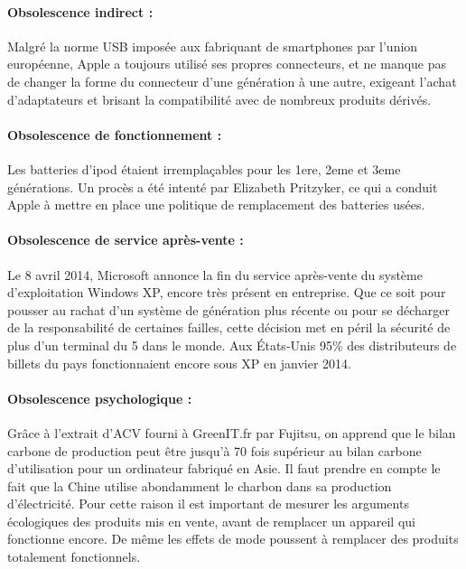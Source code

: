 \paragraph*{Obsolescence indirect :}

Malgré la norme USB imposée aux fabriquant de smartphones par l’union européenne, Apple a toujours utilisé ses propres connecteurs, et ne manque pas de changer la forme du connecteur d’une génération à une autre, exigeant l'achat d'adaptateurs et brisant la compatibilité avec de nombreux produits dérivés.

\paragraph*{Obsolescence de fonctionnement :}

Les batteries d’ipod étaient irremplaçables pour les 1ere, 2eme et 3eme générations. Un procès a été intenté par Elizabeth Pritzyker, ce qui a conduit Apple à mettre en place une politique de remplacement des batteries usées.

\paragraph*{Obsolescence de service après-vente :}

Le 8 avril 2014, Microsoft annonce la fin du service après-vente du système d’exploitation Windows XP, encore très présent en entreprise. Que ce soit pour pousser au rachat d’un système de génération plus récente ou pour se décharger de la responsabilité de certaines failles, cette décision met en péril la sécurité de plus d'un terminal du 5 dans le monde. Aux États-Unis 95\% des distributeurs de billets du pays fonctionnaient encore sous XP en janvier 2014.


\paragraph*{Obsolescence psychologique :}

Grâce à l’extrait d’ACV fourni à GreenIT.fr par Fujitsu, on apprend que le bilan carbone de production peut être jusqu’à 70 fois supérieur au bilan carbone d’utilisation pour un ordinateur fabriqué en Asie. Il faut prendre en compte le fait que la Chine utilise abondamment le charbon dans sa production d'électricité. Pour cette raison il est important de mesurer les arguments écologiques des produits mis en vente, avant de remplacer un appareil qui fonctionne encore. De même les effets de mode poussent à remplacer des produits totalement fonctionnels.
